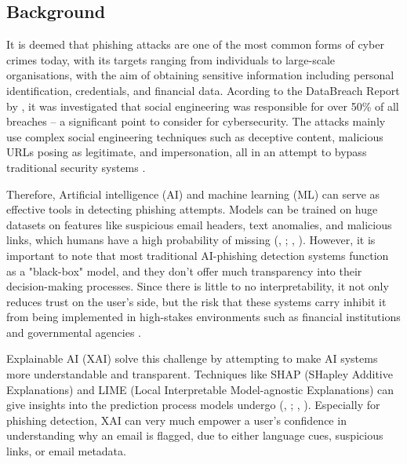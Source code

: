 
\subsection*{Background}

It is deemed that phishing attacks are one of the most common forms of cyber crimes today, with its targets ranging from individuals to large-scale organisations, with the aim of obtaining sensitive information including personal identification, credentials, and financial data. Acording to the DataBreach Report by \cite{verizon2023}, it was investigated that social engineering was responsible for over 50\% of all breaches -- a significant point to consider for cybersecurity. The attacks mainly use complex social engineering techniques such as deceptive content, malicious URLs posing as legitimate, and impersonation, all in an attempt to bypass traditional security systems \citep{marett2009effectiveness}. \newline

\noindent Therefore, Artificial intelligence (AI) and machine learning (ML) can serve as effective tools in detecting phishing attempts. Models can be trained on huge datasets on features like suspicious email headers, text anomalies, and malicious links, which humans have a high probability of missing (\citeauthor{chandrasekaran2006phoney}, \citeyear{chandrasekaran2006phoney}; \citeauthor{jain2022survey}, \citeyear{jain2022survey}). However, it is important to note that most traditional AI-phishing detection systems function as a "black-box" model, and they don't offer much transparency into their decision-making processes. Since there is little to no interpretability, it not only reduces trust on the user's side, but the risk that these systems carry inhibit it from being implemented in high-stakes environments such as financial institutions and governmental agencies \citep{ribeiro2016model}. \newline

\noindent Explainable AI (XAI) solve this challenge by attempting to make AI systems more understandable and transparent. Techniques like SHAP (SHapley Additive Explanations) and LIME (Local Interpretable Model-agnostic Explanations) can give insights into the prediction process models undergo (\citeauthor{lundberg2017unified}, \citeyear{lundberg2017unified}; \citeauthor{ribeiro2016model}, \citeyear{ribeiro2016model}). Especially for phishing detection, XAI can very much empower a user's confidence in understanding why an email is flagged, due to either language cues, suspicious links, or email metadata. \newline


